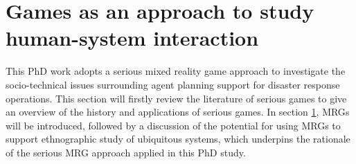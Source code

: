 \section{Games as an approach to study human-system interaction } \label{sec:LRMRgame}
This PhD work adopts a serious mixed reality game approach to investigate the socio-technical issues surrounding agent planning support for disaster response operations. This section will firstly review the literature of serious games to give an overview of the history and applications of serious games. In section \ref{sec:LRMRgame}, \acf{MRG}s will be introduced, followed by a discussion of the potential for using \ac{MRG}s to support ethnographic study of ubiquitous systems, which underpins the rationale of the serious \ac{MRG} approach applied in this PhD study.\\ 



